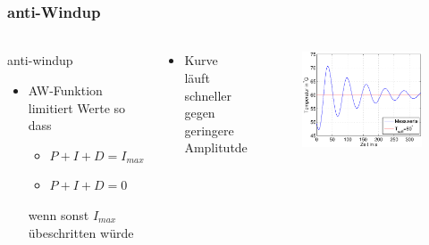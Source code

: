 \begin{frame}
    \frametitle{anti-Windup}
    \framesubtitle{}
    \begin{columns}[c]
            \begin{block}{anti-windup}
                \begin{itemize}
                    \item AW-Funktion limitiert Werte so dass
                        \begin{itemize}
                            \item $P+I+D = I_{max}$ 
                            \item $P+I+D = 0$ 
                        \end{itemize}
                        wenn sonst $I_{max}$ übeschritten würde
                \end{itemize}
            \end{block}    
            \begin{block}{}
                \begin{itemize}
                    \item Kurve läuft schneller gegen geringere Amplitutde
                \end{itemize}
            \end{block}
            \begin{figure}[H]
            \begin{center}
                    \includegraphics[scale=0.3]{./img/plots/2_c_100_wind.eps}

\end{center}
\end{figure}
\end{columns}
\end{frame}

